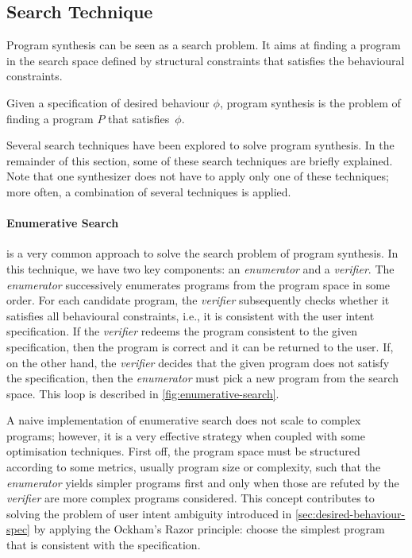 
\subsection{Search Technique}\label{sec:search-technique}

Program synthesis can be seen as a search problem. It aims at finding a program in the search space defined by structural constraints that satisfies the behavioural constraints.

\begin{definition}
Given a specification of desired behaviour \(\phi\), program synthesis is the problem of finding a program \(P\) that satisfies~\(\phi\).
\end{definition}


Several search techniques have been explored to solve program synthesis. In the remainder of this section, some of these search techniques are briefly explained. Note that one synthesizer does not have to apply only one of these techniques; more often, a combination of several techniques is applied.


\paragraph{Enumerative Search}\label{sec:enum-search} \cite{DBLP:conf/pldi/FengMGDC17,DBLP:conf/pldi/FengMBD18,DBLP:conf/gpce/LeeSO16,Orvalho19,DBLP:conf/cav/ReynoldsBNBT19} is a very common approach to solve the search problem of program synthesis. In this technique, we have two key components: an \textit{enumerator} and a \textit{verifier}.
The \textit{enumerator} successively enumerates programs from the program space in some order. For each candidate program, the \textit{verifier} subsequently checks whether it satisfies all behavioural constraints, i.e., it is consistent with the user intent specification.
If the \textit{verifier} redeems the program consistent to the given specification, then the program is correct and it can be returned to the user.
If, on the other hand, the \textit{verifier} decides that the given program does not satisfy the specification, then the \textit{enumerator} must pick a new program from the search space.
This loop is described in \autoref{fig:enumerative-search}.

A naive implementation of enumerative search does not scale to complex programs; however, it is a very effective strategy when coupled with some optimisation techniques. First off, the program space must be structured according to some metrics, usually program size or complexity, such that the \textit{enumerator} yields simpler programs first and only when those are refuted by the \textit{verifier} are more complex programs considered. This concept contributes to solving the problem of user intent ambiguity introduced in \autoref{sec:desired-behaviour-spec} by applying the Ockham's Razor principle: choose the simplest program that is consistent with the specification.

